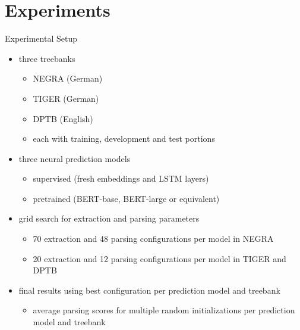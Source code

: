 \documentclass[aspectratio=169, 10pt]{beamer}
\begin{document}
    \section{Experiments}
    \begin{frame}{Experimental Setup}
            \begin{itemize}
                \item<+-> three treebanks
                \begin{itemize}
                    \item NEGRA (German)
                    \item TIGER (German)
                    \item DPTB (English)
                    \item each with training, development and test portions
                \end{itemize}
                \item<+-> three neural prediction models
                \begin{itemize}
                    \item supervised (fresh embeddings and LSTM layers)
                    \item pretrained (BERT-base, BERT-large or equivalent)
                \end{itemize}
                \item<+-> grid search for extraction and parsing parameters
                \begin{itemize}
                    \item 70 extraction and 48 parsing configurations per model in NEGRA
                    \item 20 extraction and 12 parsing configurations per model in TIGER and DPTB
                \end{itemize}
                \item<+-> final results using best configuration per prediction model and treebank
                \begin{itemize}
                    \item average parsing scores for multiple random initializations per prediction model and treebank
                \end{itemize}
            \end{itemize}
    \end{frame}
\end{document}
